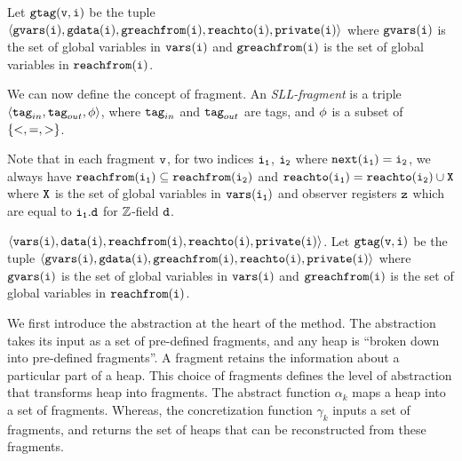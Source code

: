 Let $\tt gtag(v,i)$ be the tuple $\tt \left\langle\tt gvars(i), gdata(i),{\tt greachfrom}(\tt i), {\tt reachto}(\tt i), private(i )\right\rangle$ where $\tt gvars(i)$ is the set of global variables in $\tt vars(i)$ and $\tt greachfrom(i)$ is the set of global variables in $\tt reachfrom(i)$.

We can now define the concept of fragment.
An {\em SLL-fragment} is a triple
$\left\langle\mathtt{tag}_{in},\mathtt{tag}_{out},\phi\right\rangle$, where $\mathtt{tag}_{in}$ and $\mathtt{tag}_{out}$ are tags, and $\phi$
is a subset of $\left\{<, =, >\right\}$.

Note that in each fragment $\tt v$, for two indices $\tt i_1$, $\tt i_2$ where $\tt next(i_1) = i_2$, we always have $\tt {\tt reachfrom}(\tt i_1) \subseteq \tt {\tt reachfrom}(\tt i_2)$ and $\tt {\tt reachto}(\tt i_1) = \tt {\tt reachto}(\tt i_2) \cup X$ where $\tt X$ is the set of global variables in ${\tt vars}(\tt i_1)$ and observer registers $\tt z$ which are equal to $\tt i_1.d$ for ${\mathbb Z}$-field $\tt d$. 
  
$\tt \left\langle\tt vars(i), data(i),{\tt reachfrom}(\tt i), {\tt reachto}(\tt i), private(i )\right\rangle$. Let $\tt gtag(v,i)$ be the tuple $\tt \left\langle\tt gvars(i), gdata(i),{\tt greachfrom}(\tt i), {\tt reachto}(\tt i), private(i )\right\rangle$ where $\tt gvars(i)$ is the set of global variables in $\tt vars(i)$ and $\tt greachfrom(i)$ is the set of global variables in $\tt reachfrom(i)$. 

We first introduce the abstraction at the heart of the method. The abstraction takes its input as a set of pre-defined fragments, and any heap is ``broken down into pre-defined fragments''. A fragment retains the information about a particular part of a heap. This choice of fragments defines the level of abstraction that transforms heap into fragments. The abstract function $\alpha_k$ maps a heap into a set of fragments. Whereas, the concretization function $\gamma_k$ inputs a set of fragments, and returns the set of heaps that can be reconstructed from these fragments. 
